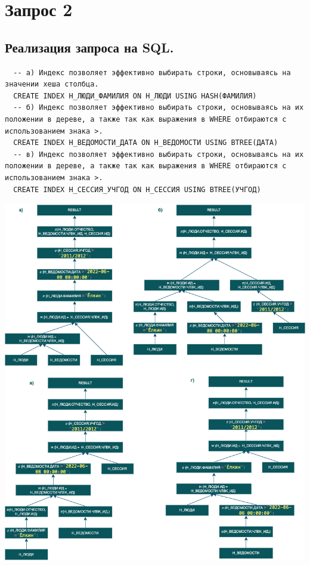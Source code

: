 \documentclass[12pt,onecolumn]{article}
\begin{document}
\section{Запрос 2}
\subsection{Реализация запроса на SQL.}

\begin{lstlisting}
  -- a) Индекс позволяет эффективно выбирать строки, основываясь на значении хеша столбца.
  CREATE INDEX Н_ЛЮДИ_ФАМИЛИЯ ON Н_ЛЮДИ USING HASH(ФАМИЛИЯ)
  -- б) Индекс позволяет эффективно выбирать строки, основываясь на их положении в дереве, а также так как выражения в WHERE отбираются с использованием знака >.
  CREATE INDEX Н_ВЕДОМОСТИ_ДАТА ON Н_ВЕДОМОСТИ USING BTREE(ДАТА)
  -- в) Индекс позволяет эффективно выбирать строки, основываясь на их положении в дереве, а также так как выражения в WHERE отбираются с использованием знака >.
  CREATE INDEX Н_СЕССИЯ_УЧГОД ON Н_СЕССИЯ USING BTREE(УЧГОД)
\end{lstlisting}
\includegraphics[width=\textwidth]{./image/plan-2.png}
\end{document}
